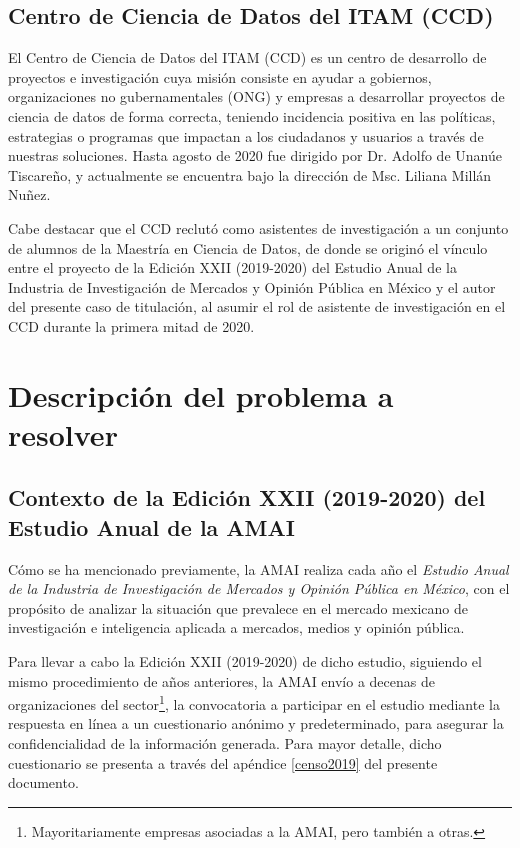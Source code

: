 \subsection{Centro de Ciencia de Datos del ITAM (CCD)}

El Centro de Ciencia de Datos del ITAM (CCD) es un centro de desarrollo de proyectos e investigación cuya misión consiste en ayudar a gobiernos, organizaciones no gubernamentales (ONG) y empresas a desarrollar proyectos de ciencia de datos de forma correcta, teniendo incidencia positiva en las políticas, estrategias o programas que impactan a los ciudadanos y usuarios a través de nuestras soluciones. Hasta agosto de 2020 fue dirigido por Dr. Adolfo de Unanúe Tiscareño, y actualmente se encuentra bajo la dirección de Msc. Liliana Millán Nuñez.

Cabe destacar que el CCD reclutó como asistentes de investigación a un conjunto de alumnos de la Maestría en Ciencia de Datos, de donde se originó el vínculo entre el proyecto de la Edición XXII (2019-2020) del Estudio Anual de la Industria de Investigación de Mercados y Opinión Pública en México y el autor del presente caso de titulación, al asumir el rol de asistente de investigación en el CCD durante la primera mitad de 2020.

\section{Descripción del problema a resolver}

\subsection{Contexto de la Edición XXII (2019-2020) del Estudio Anual de la AMAI}

Cómo se ha mencionado previamente, la AMAI realiza cada año el \emph{Estudio Anual de la Industria de Investigación de Mercados y Opinión Pública en México}, con el propósito de analizar la situación que prevalece en el mercado mexicano de investigación e inteligencia aplicada a mercados, medios y opinión pública.

Para llevar a cabo la Edición XXII (2019-2020) de dicho estudio, siguiendo el mismo procedimiento de años anteriores, la AMAI envío a decenas de organizaciones del sector\footnote{Mayoritariamente empresas asociadas a la AMAI, pero también a otras.}, la convocatoria a participar en el estudio mediante la respuesta en línea a un cuestionario anónimo y predeterminado, para asegurar la confidencialidad de la información generada. Para mayor detalle, dicho cuestionario se presenta a través del apéndice \ref{censo2019} del presente documento.


